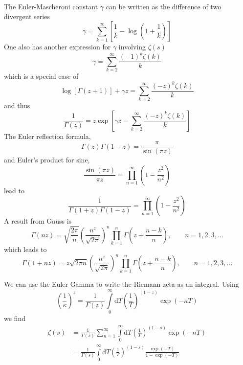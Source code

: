 The Euler-Mascheroni constant $\gamma$ can be written as the difference of two divergent series
\begin{equation}
	\gamma = \sum_{k = 1}^{\infty} \left[ \frac{1}{k} - \log{\left( 1 + \frac{1}{k} \right)} \right]
\end{equation}
One also has another expression for $\gamma$ involving $\zeta(s)$
\begin{equation}
	\gamma = \sum_{k = 2}^{\infty} \frac{(-1)^{k} \zeta(k)}{k}
\end{equation}
which is a special case of
\begin{equation}
	\log{\left[ \Gamma(z + 1) \right]} + \gamma z = \sum_{k = 2}^{\infty} \frac{(-z)^{k} \zeta(k)}{k}
\end{equation}
and thus
\begin{equation}
	\frac{1}{\Gamma(z)} = z \exp{\left[ \gamma z - \sum_{k = 2}^{\infty} \frac{(-z)^{k} \zeta(k)}{k} \right]}
\end{equation}
The Euler reflection formula,
\begin{equation}
	\Gamma(z) \Gamma(1 - z) = \frac{\pi}{\sin{(\pi z)}}
\end{equation}
and Euler's product for sine,
\begin{equation}
	\frac{\sin{(\pi z)}}{\pi z} = \prod_{n = 1}^{\infty} \left(1 - \frac{z^{2}}{n^{2}} \right)
\end{equation}
lead to
\begin{equation}
	\frac{1}{\Gamma(1 + z) \Gamma(1 - z)} =\prod_{n = 1}^{\infty} \left(1 - \frac{z^{2}}{n^{2}} \right)
\end{equation}
A result from Gauss is
\begin{equation}
	\Gamma(n z) = \sqrt{\frac{2 \pi}{n}} \left( \frac{n^{z}}{\sqrt{2 \pi}} \right)^{n} \prod_{k = 1}^{n} \Gamma\left(z + \frac{n - k}{n} \right), \qquad n = 1, 2, 3, \ldots
\end{equation}
which leads to
\begin{equation}
	\Gamma(1 + n z) = z\sqrt{2 \pi n} \left( \frac{n^{z}}{\sqrt{2 \pi}} \right)^{n} \prod_{k = 1}^{n} \Gamma\left(z + \frac{n - k}{n} \right), \qquad n = 1, 2, 3, \ldots
\end{equation}

We can use the Euler Gamma to write the Riemann zeta as an integral. Using
\begin{equation}
	\left( \frac{1}{\kappa} \right)^{z} = \frac{1}{\Gamma(z)} \int\limits_{0}^{\infty} \mathrm{d}T \left( \frac{1}{T} \right)^{(1-z)} \exp{(- \kappa T)}
\end{equation}
we find
\begin{equation}
\begin{split}
	\zeta(s) &= \frac{1}{\Gamma(s)} \sum_{n = 1}^{\infty} \int\limits_{0}^{\infty} \mathrm{d}T \left( \frac{1}{T} \right)^{(1-s)} \exp{(- n T)} \\
	&= \frac{1}{\Gamma(s)} \int\limits_{0}^{\infty} \mathrm{d}T \left( \frac{1}{T} \right)^{(1-s)} \frac{\exp{(-T)}}{1 - \exp{(-T)}}
\end{split}
\end{equation}
